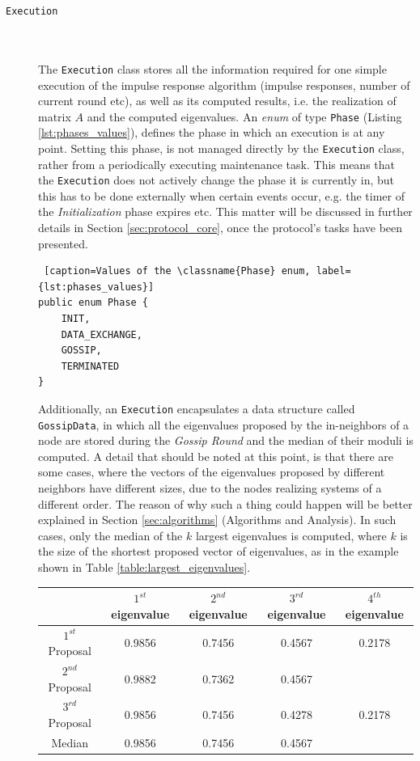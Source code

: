\documentclass[a4paper,11pt,twoside]{report}
\newcommand{\classname}[1]{\texttt{#1}}
\begin{document}
\begin{description}
\item[\classname{Execution}] \hfill \\\\
The \classname{Execution} class stores all the information required for one simple execution of the impulse response algorithm (impulse responses, number of current round etc), as well as its computed results, i.e. the realization of matrix $A$ and the computed eigenvalues. An \textit{enum} of type \classname{Phase} (Listing \ref{lst:phases_values}), defines the phase in which an execution is at any point. Setting this phase, is not managed directly by the \classname{Execution} class, rather from a periodically executing maintenance task. This means that the \classname{Execution} does not actively change the phase it is currently in, but this has to be done externally when certain events occur, e.g. the timer of the \textit{Initialization} phase expires etc. This matter will be discussed in further details in Section \ref{sec:protocol_core}, once the protocol's tasks have been presented.


\begin{lstlisting} [caption=Values of the \classname{Phase} enum, label={lst:phases_values}]
public enum Phase {
	INIT, 
	DATA_EXCHANGE, 
	GOSSIP,
	TERMINATED
}
\end{lstlisting}


Additionally, an \classname{Execution} encapsulates a data structure called \classname{GossipData}, in which all the eigenvalues proposed by the in-neighbors of a node are stored during the \textit{Gossip Round} and the median of their moduli is computed. A detail that should be noted at this point, is that there are some cases, where the vectors of the eigenvalues proposed by different neighbors have different sizes, due to the nodes realizing systems of a different order. The reason of why such a thing could happen will be better explained in Section \ref{sec:algorithms} (Algorithms and Analysis). In such cases, only the median of the $k$ largest eigenvalues is computed, where $k$ is the size of the shortest proposed vector of eigenvalues, as in the example shown in Table \ref{table:largest_eigenvalues}. \\


\begin{table}[H]
\centering
\begin{tabular}{c|c|c|c|c|}

\cline{2-5}
& $1^{st}$ eigenvalue & $2^{nd}$ eigenvalue & $3^{rd}$ eigenvalue & $4^{th}$ eigenvalue \\ \hline
\multicolumn{1}{|c|}{$1^{st}$ Proposal} & 0.9856 & 0.7456 & 0.4567 & 0.2178\\
\hline
\multicolumn{1}{|c|}{$2^{nd}$ Proposal} & 0.9882 & 0.7362 & 0.4567 & \cellcolor{lightgray}\\
\hline
\multicolumn{1}{|c|}{$3^{rd}$ Proposal} & 0.9856 & 0.7456 & 0.4278 & 0.2178 \\
\hline
\hline
\multicolumn{1}{|c|}{Median} & 0.9856 & 0.7456 & 0.4567 & \cellcolor{lightgray} \\
\hline


\end{tabular}
\end{table}
\end{description}
\end{document}
